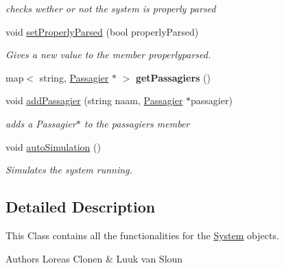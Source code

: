 \begin{DoxyCompactItemize}
\begin{DoxyCompactList}\small\item\em checks wether or not the system is properly parsed \end{DoxyCompactList}\item 
void \hyperlink{classSystem_af140010428a79ddde06f3546e7737d86}{set\+Properly\+Parsed} (bool properly\+Parsed)\hypertarget{classSystem_af140010428a79ddde06f3546e7737d86}{}\label{classSystem_af140010428a79ddde06f3546e7737d86}

\begin{DoxyCompactList}\small\item\em Gives a new value to the member properlyparsed. \end{DoxyCompactList}\item 
map$<$ string, \hyperlink{classPassagier}{Passagier} $\ast$ $>$ {\bfseries get\+Passagiers} ()\hypertarget{classSystem_a25bf1c319312604ce89890fa827f4552}{}\label{classSystem_a25bf1c319312604ce89890fa827f4552}

\item 
void \hyperlink{classSystem_ad2a3016a3d4cf9273cf8156f4fc69dfb}{add\+Passagier} (string naam, \hyperlink{classPassagier}{Passagier} $\ast$passagier)
\begin{DoxyCompactList}\small\item\em adds a Passagier$\ast$ to the passagiers member \end{DoxyCompactList}\item 
void \hyperlink{classSystem_ae392bbed93678914f3b0aff18c4a6d4d}{auto\+Simulation} ()\hypertarget{classSystem_ae392bbed93678914f3b0aff18c4a6d4d}{}\label{classSystem_ae392bbed93678914f3b0aff18c4a6d4d}

\begin{DoxyCompactList}\small\item\em Simulates the system running. \end{DoxyCompactList}\end{DoxyCompactItemize}


\subsection{Detailed Description}
This Class contains all the functionalities for the \hyperlink{classSystem}{System} objects. 

\begin{DoxyAuthor}{Authors}
Loreas Clonen \& Luuk van Sloun 
\end{DoxyAuthor}


